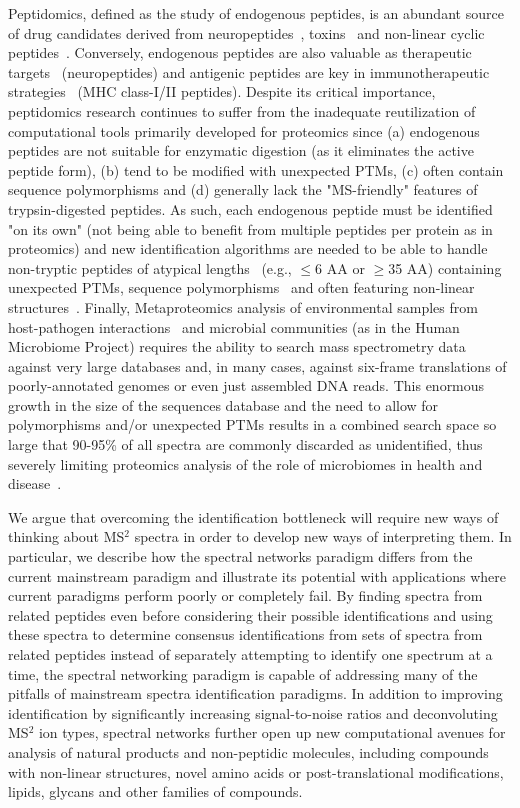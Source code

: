 \documentclass[8.5pt,twoside,twocolumn]{article}
\begin{document}
Peptidomics, defined as the study of endogenous peptides, is an abundant source of drug candidates derived from neuropeptides~\cite{robertson11}, toxins~\cite{king11} and non-linear cyclic peptides~\cite{colgrave10}. Conversely, endogenous peptides are also valuable as therapeutic targets~\cite{jaggi11} (neuropeptides) and antigenic peptides are key in immunotherapeutic strategies~\cite{depontieu09} (MHC class-I/II peptides). Despite its critical importance, peptidomics research continues to suffer from the inadequate reutilization of computational tools primarily developed for proteomics since (a) endogenous peptides are not suitable for enzymatic digestion (as it eliminates the active peptide form), (b) tend to be modified with unexpected PTMs, (c) often contain sequence polymorphisms and (d) generally lack the "MS-friendly" features of trypsin-digested peptides. As such, each endogenous peptide must be identified "on its own" (not being able to benefit from multiple peptides per protein as in proteomics) and new identification algorithms are needed to be able to handle non-tryptic peptides of atypical lengths~\cite{jaggi11} (e.g., $\leq$6 AA or $\geq$35 AA) containing unexpected PTMs, sequence polymorphisms~\cite{klug09, colgrave10} and often featuring non-linear structures~\cite{king11,colgrave10}. Finally, Metaproteomics analysis of environmental samples from host-pathogen interactions~\cite{zheng11} and microbial communities (as in the Human Microbiome Project) requires the ability to search mass spectrometry data against very large databases and, in many cases, against six-frame translations of poorly-annotated genomes or even just assembled DNA reads. This enormous growth in the size of the sequences database and the need to allow for polymorphisms and/or unexpected PTMs results in a combined search space so large that 90-95\% of all spectra are commonly discarded as unidentified, thus severely limiting proteomics analysis of the role of microbiomes in health and disease~\cite{pflughoeft11}.

We argue that overcoming the identification bottleneck will require new ways of thinking about MS$^2$ spectra in order to develop new ways of interpreting them. In particular, we describe how the spectral networks paradigm differs from the current mainstream paradigm and illustrate its potential with applications where current paradigms perform poorly or completely fail. By finding spectra from related peptides even before considering their possible identifications and using these spectra to determine consensus identifications from sets of spectra from related peptides instead of separately attempting to identify one spectrum at a time, the spectral networking paradigm is capable of addressing many of the pitfalls of mainstream spectra identification paradigms. In addition to improving identification by significantly increasing signal-to-noise ratios and deconvoluting MS$^2$ ion types, spectral networks further open up new computational avenues for analysis of natural products and non-peptidic molecules, including compounds with non-linear structures, novel amino acids or post-translational modifications, lipids, glycans and other families of compounds.
\end{document}

